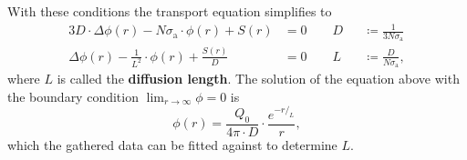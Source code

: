 With these conditions the transport equation simplifies to
\begin{alignat*}{3}
	D\cdot\Delta\phi(r) - N\sigma_\text{a}\cdot\phi(r) + S(r) &= 0 \qquad D&&\coloneqq\frac{1}{3N\sigma_\text{a}}\\
	\Delta\phi(r) - \frac{1}{L^2}\cdot\phi(r) + \frac{S(r)}{D} &= 0 \qquad L&&\coloneqq\frac{D}{N\sigma_\text{a}},
\end{alignat*}
where $L$ is called the \textbf{diffusion length}.
The solution of the equation above with the boundary condition $\lim_{r\rightarrow\infty}\phi = 0$ is
\begin{equation}\label{eq:sol}
	\phi(r) = \frac{Q_0}{4\pi\cdot D}\cdot \frac{e^{-r/_L}}{r},
\end{equation}
which the gathered data can be fitted against to determine $L$.
